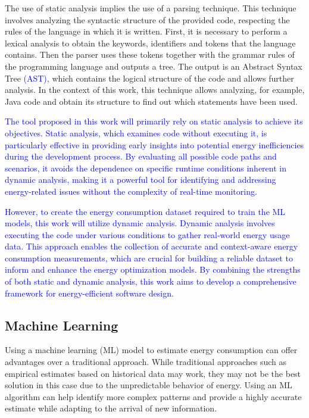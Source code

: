 \documentclass[sigplan]{acmart}
\newcommand{\wnote}[1]{\textcolor{blue}{#1}}
\begin{document}
The use of static analysis implies the use of a parsing technique. This technique involves analyzing the syntactic structure of the provided code, respecting the rules of the language in which it is written. First, it is necessary to perform a lexical analysis to obtain the keywords, identifiers and tokens that the language contains. Then the parser uses these tokens together with the grammar rules of the programming language and outputs a tree. The output is an Abstract Syntax Tree \wnote{(AST)}, which contains the logical structure of the code and allows further analysis. In the context of this work, this technique allows analyzing, for example, Java code and obtain its structure to find out which statements have been used.


\wnote{The tool proposed in this work will primarily rely on static analysis to achieve its objectives. Static analysis, which examines code without executing it, is particularly effective in providing early insights into potential energy inefficiencies during the development process. By evaluating all possible code paths and scenarios, it avoids the dependence on specific runtime conditions inherent in dynamic analysis, making it a powerful tool for identifying and addressing energy-related issues without the complexity of real-time monitoring.}

\wnote{However, to create the energy consumption dataset required to train the ML models, this work will utilize dynamic analysis. Dynamic analysis involves executing the code under various conditions to gather real-world energy usage data. This approach enables the collection of accurate and context-aware energy consumption measurements, which are crucial for building a reliable dataset to inform and enhance the energy optimization models. By combining the strengths of both static and dynamic analysis, this work aims to develop a comprehensive framework for energy-efficient software design.}


\subsection{Machine Learning} \label{sec:background_machine_learning}

Using a machine learning (ML) model to estimate energy consumption can offer advantages over a traditional approach. While traditional approaches such as empirical estimates based on historical data may work, they may not be the best solution in this case due to the unpredictable behavior of energy. Using an ML algorithm can help identify more complex patterns and provide a highly accurate estimate while adapting to the arrival of new information.
\end{document}
